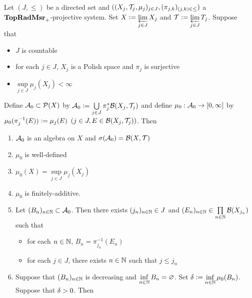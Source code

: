 \documentclass{book}
\begin{document}

\begin{ex}   \\
	Let $(J, {\leq})$ be a directed set and $((X_j, \mathcal{T}_j, \mu_j)_{j \in J}, (\pi_{j,k})_{(j,k) \in {\leq}})$ a $\operatorname*{\text{\textbf{TopRadMsr}}_{+}}$-projective system. Set $X \vcentcolon= \varprojlim\limits_{j \in J} X_j$ and $\mathcal{T} \vcentcolon= \varprojlim\limits_{j \in J} T_j$. Suppose that 
	\begin{itemize}
		\item $J$ is countable
		\item for each $j \in J$, $X_j$ is a Polish space and $\pi_j$ is surjective
		\item $\sup\limits_{j \in J} \mu_j(X_j) < \infty$ 
	\end{itemize}
	Define $\mathcal{A}_0 \subset \mathcal{P}(X)$ by $\mathcal{A}_0 \vcentcolon= \bigcup\limits_{j \in J} \pi_j^*\mathcal{B}(X_j, \mathcal{T}_j)$ and define $\mu_0: \mathcal{A}_0 \rightarrow [0,\infty]$ by $\mu_0(\pi_j^{-1}(E)) \vcentcolon= \mu_j(E)$ $(j \in J, E \in \mathcal{B}(X_j, \mathcal{T}_j))$. Then
	\begin{enumerate}
		\item $\mathcal{A}_0$ is an algebra on $X$ and $\sigma(\mathcal{A}_0) = \mathcal{B}(X, \mathcal{T})$
		\item $\mu_0$ is well-defined
		\item $\mu_0(X) = \sup\limits_{j \in J} \mu_j(X_j)$
		\item $\mu_0$ is finitely-additive.
		\item Let $(B_n)_{n \in \mathbb{N}} \subset \mathcal{A}_0$. Then there exists $(j_n)_{n \in \mathbb{N}} \in J$ and $(E_n)_{n \in \mathbb{N}} \in \prod\limits_{n \in \mathbb{N}} \mathcal{B}(X_{j_n})$ such that 
		\begin{itemize}
			\item for each $n \in \mathbb{N}$, $B_n = \pi_{j_n}^{-1}(E_n)$ 
			\item for each $j \in J$, there exists $n \in \mathbb{N}$ such that $j \leq j_n$
		\end{itemize}
		\item Suppose that $(B_n)_{n \in \mathbb{N}}$ is decreasing and $\inf\limits_{n \in \mathbb{N}} B_n = \varnothing$. Set $\delta \vcentcolon= \inf\limits_{n \in \mathbb{N}} \mu_0(B_n)$. Suppose that $\delta > 0$. Then 

\end{enumerate}
\end{ex}
\end{document}
